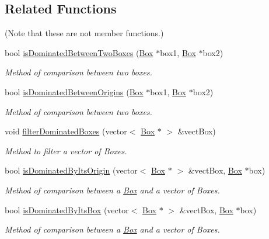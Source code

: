 \subsection*{\-Related \-Functions}
(\-Note that these are not member functions.) \begin{DoxyCompactItemize}
\item 
bool \hyperlink{classBox_ada27264850e8a9b61d4833a1a9bc5ca7}{is\-Dominated\-Between\-Two\-Boxes} (\hyperlink{classBox}{\-Box} $\ast$box1, \hyperlink{classBox}{\-Box} $\ast$box2)
\begin{DoxyCompactList}\small\item\em \-Method of comparison between two boxes. \end{DoxyCompactList}\item 
bool \hyperlink{classBox_a75b3d174ae55517797459916d5bc07ef}{is\-Dominated\-Between\-Origins} (\hyperlink{classBox}{\-Box} $\ast$box1, \hyperlink{classBox}{\-Box} $\ast$box2)
\begin{DoxyCompactList}\small\item\em \-Method of comparison between two boxes. \end{DoxyCompactList}\item 
void \hyperlink{classBox_af9d038887f617a766f86d8a4f0e8d55e}{filter\-Dominated\-Boxes} (vector$<$ \hyperlink{classBox}{\-Box} $\ast$ $>$ \&vect\-Box)
\begin{DoxyCompactList}\small\item\em \-Method to filter a vector of {\ttfamily \-Boxes}. \end{DoxyCompactList}\item 
bool \hyperlink{classBox_a57b4536cd76dabffd7326328a2be4b4b}{is\-Dominated\-By\-Its\-Origin} (vector$<$ \hyperlink{classBox}{\-Box} $\ast$ $>$ \&vect\-Box, \hyperlink{classBox}{\-Box} $\ast$box)
\begin{DoxyCompactList}\small\item\em \-Method of comparison between a {\ttfamily \hyperlink{classBox}{\-Box}} and a vector of {\ttfamily \-Boxes}. \end{DoxyCompactList}\item 
bool \hyperlink{classBox_ac8a6e3cd3d38d463bb650ceb4ae88497}{is\-Dominated\-By\-Its\-Box} (vector$<$ \hyperlink{classBox}{\-Box} $\ast$ $>$ \&vect\-Box, \hyperlink{classBox}{\-Box} $\ast$box)
\begin{DoxyCompactList}\small\item\em \-Method of comparison between a {\ttfamily \hyperlink{classBox}{\-Box}} and a vector of {\ttfamily \-Boxes}. \end{DoxyCompactList}\end{DoxyCompactItemize}


